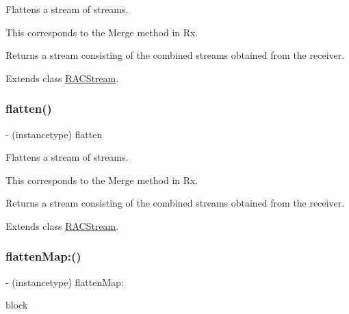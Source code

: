 Flattens a stream of streams.

This corresponds to the {\ttfamily Merge} method in Rx.

Returns a stream consisting of the combined streams obtained from the receiver. 

Extends class \mbox{\hyperlink{interface_r_a_c_stream_a02767823dfe3d4682709e066e15e388c}{R\+A\+C\+Stream}}.

\mbox{\label{category_r_a_c_stream_07_operations_08_a02767823dfe3d4682709e066e15e388c}} 
\subsubsection{\texorpdfstring{flatten()}{flatten()}\hspace{0.1cm}{\footnotesize\ttfamily [3/3]}}
{\footnotesize\ttfamily -\/ (instancetype) flatten \begin{DoxyParamCaption}{ }\end{DoxyParamCaption}}

Flattens a stream of streams.

This corresponds to the {\ttfamily Merge} method in Rx.

Returns a stream consisting of the combined streams obtained from the receiver. 

Extends class \mbox{\hyperlink{interface_r_a_c_stream_a02767823dfe3d4682709e066e15e388c}{R\+A\+C\+Stream}}.

\mbox{\label{category_r_a_c_stream_07_operations_08_a2441b0306adc6ae2845219f8b116119a}} 
\subsubsection{\texorpdfstring{flatten\+Map\+:()}{flattenMap:()}\hspace{0.1cm}{\footnotesize\ttfamily [1/3]}}
{\footnotesize\ttfamily -\/ (instancetype) flatten\+Map\+: \begin{DoxyParamCaption}\item[{(\mbox{\hyperlink{interface_r_a_c_stream}{R\+A\+C\+Stream}} $\ast$($^\wedge$)(id value))}]{block }\end{DoxyParamCaption}}


